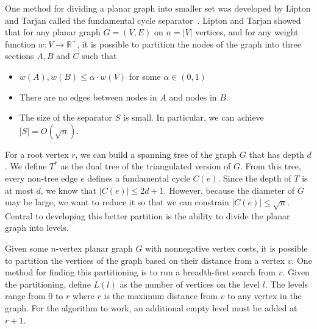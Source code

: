 \documentclass[12pt]{article}
\begin{document}
    One method for dividing a planar graph into smaller set was developed by Lipton and Tarjan called the fundamental cycle separator~\cite{lipton1979separator}. Lipton and Tarjan showed that for any planar graph $G = (V,E)$ on $n = |V|$ vertices, and for any weight function $w: V \rightarrow \mathbb{R}^+$, it is possible to partition the nodes of the graph into three sections $A, B$ and $C$ such that
    \begin{itemize}
        \item $w(A), w(B) \leq \alpha \cdot w(V)$ for some $\alpha \in (0,1)$

        \item There are no edges between nodes in $A$ and nodes in $B$.

        \item The size of the separator $S$ is small. In particular, we can achieve $|S| = O(\sqrt{n})$.
    \end{itemize}

    For a root vertex $r$, we can build a spanning tree of the graph $G$ that has depth $d$. We define $T^*$ as the dual tree of the triangulated version of $G$. From this tree, every non-tree edge $e$ defines a fundamental cycle $C(e)$. Since the depth of $T$ is at most $d$, we know that $|C(e)| \leq 2d + 1$. However, because the diameter of $G$ may be large, we want to reduce it so that we can constrain $|C(e)| \leq \sqrt{n}$. Central to developing this better partition is the ability to divide the planar graph into levels.

Given some $n$-vertex planar graph $G$ with nonnegative vertex costs, it is possible to partition the vertices of the graph based on their distance from a vertex $v$. One method for finding this partitioning is to run a breadth-first search from $v$. Given the partitioning, define $L(l)$ as the number of vertices on the level $l$. The levels range from $0$ to $r$ where $r$ is the maximum distance from $v$ to any vertex in the graph. For the algorithm to work, an additional empty level must be added at $r+1$.
\end{document}
